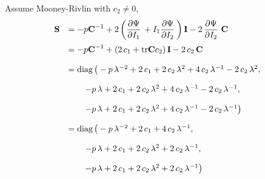 Assume Mooney-Rivlin with $c_2 \neq 0$,
\begin{equation*}
  \begin{array}{lll}
    \bfS &= -p\bfC^{-1} + 2\left(\p{\Psi}{I_1} + I_1\p{\Psi}{I_2}\right)\bfI - 2\,\p{\Psi}{I_2}\,\bfC\\[4mm]
     &= -p\bfC^{-1} + (2\,c_1 + \tr\bfC c_2)\,\bfI - 2\,c_2\,\bfC \\[4mm]
    &= \diag\big( -p\,\lambda^{-2} + 2\,c_1 + 2\,c_2\,\lambda^2 + 4\,c_2\,\lambda^{-1} - 2\,c_2\,\lambda^2,\\[4mm]
    &\qquad
    -p\,\lambda + 2\,c_1 + 2\,c_2\,\lambda^2 + 4\,c_2\,\lambda^{-1} - 2\,c_2\,\lambda^{-1},\\[4mm]
    &\qquad
     -p\,\lambda  + 2\,c_1 + 2\,c_2\,\lambda^2 + 4\,c_2\,\lambda^{-1} - 2\,c_2\,\lambda^{-1}\big)\\[4mm]
    &= \diag\big( -p\,\lambda^{-2} + 2\,c_1 + 4\,c_2\,\lambda^{-1},\\[4mm]
    &\qquad
    -p\,\lambda + 2\,c_1 + 2\,c_2\,\lambda^2 + 2\,c_2\,\lambda^{-1},\\[4mm]
    &\qquad
     -p\,\lambda  + 2\,c_1 + 2\,c_2\,\lambda^2 + 2\,c_2\,\lambda^{-1}\big)
  \end{array}
\end{equation*}

